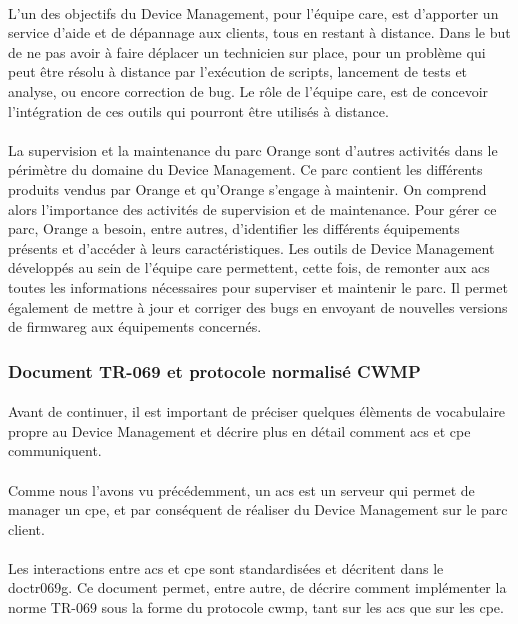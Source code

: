 \documentclass[12pt,a4paper]{report}
\begin{document}
\paragraph*{}
L’un des objectifs du Device Management, pour l’équipe \gls{care}, est d’apporter un service d’aide et de dépannage aux clients, tous en restant à distance. Dans le but de ne pas avoir à faire déplacer un technicien sur place, pour un problème qui peut être résolu à distance par l’exécution de scripts, lancement de tests et analyse, ou encore correction de bug. Le rôle de l’équipe \gls{care}, est de concevoir l’intégration de ces outils qui pourront être utilisés à distance.
\paragraph*{}
La supervision et la maintenance du parc Orange sont d'autres activités dans le
périmètre du domaine du Device Management. Ce parc contient les différents produits vendus par Orange et qu’Orange s'engage à maintenir. On comprend alors l'importance des activités de supervision et de maintenance. Pour gérer ce parc, Orange a besoin, entre autres, d'identifier les différents équipements présents et d'accéder à leurs  caractéristiques. Les outils de Device Management  développés au sein de l'équipe \gls{care} permettent, cette fois, de remonter aux \gls{acs} toutes les informations nécessaires pour superviser et maintenir le parc. Il permet également de mettre à jour et corriger des bugs en envoyant de nouvelles versions de \gls{firmwareg} aux équipements concernés. \\
\subsubsection{Document TR-069 et protocole normalisé CWMP}
\paragraph*{} Avant de continuer, il est important de préciser quelques élèments de vocabulaire propre au Device Management et décrire plus en détail comment \gls{acs} et \gls{cpe} communiquent.
\paragraph*{}Comme nous l'avons vu précédemment, un \gls{acs} est un serveur qui permet de manager un \gls{cpe}, et par conséquent de réaliser du Device Management sur le parc client. 
\paragraph*{}Les interactions entre \gls{acs} et \gls{cpe} sont standardisées et décritent dans le \gls{doctr069g}. Ce document permet, entre autre, de décrire comment implémenter la norme TR-069 sous la forme du protocole \gls{cwmp}, tant sur les \gls{acs} que sur les \gls{cpe}.
\end{document}
